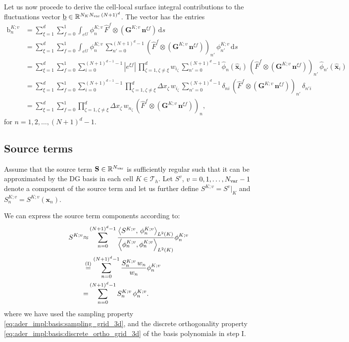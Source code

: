 \documentclass{scrreprt}
\theoremstyle{definition}
\theoremstyle{nonumberplain}
\renewcommand{\vec}[1]{{\textbf{#1}}}
\newcommand{\laVec}[1]{\underline{\mathrm{#1}}}
\newcommand{\laVecel}[1]{\mathrm{#1}}
\newcommand{\tria}{\mathcal{T}_h}
\newcommand{\cell}{K}
\newcommand{\face}{e}
\newcommand{\ds}{\text{d}s}
\newcommand{\refVec}[1]{\hat{\vec{#1}}}
\begin{document}
Let us now procede to derive the cell-local surface integral contributions to
the fluctuations vector $\laVec{b}\in \mathbb{R}^{N_\cell
N_\textup{var}\,(N+1)^d}$.
The vector has the entries
\begin{align*}
\laVecel{b}^{\cell;v}_n &=
\sum_{\xi=1}^{d}
\sum_{f=0}^{1}
\int_{\face^{\xi f}} {\phi}^{K;v}_{n}\,
\hat{F}^f\otimes(\vec{G}^{\cell;v}\,\vec{n}^{\xi
f})
\,\ds
\\
&=
\sum_{\xi=1}^{d}
\sum_{f=0}^{1}
\int_{\face^{\xi f}} {\phi}^{K;v}_{n}\,
\sum_{n'=0}^{(N+1)^{d}-1}
(\hat{F}^f\otimes(\vec{G}^{\cell;v}\,\vec{n}^{\xi
f}))_{n'}
\,
{\phi}^{K;v}_{n'}\,\ds
\\
&=
\sum_{\xi=1}^{d}
\sum_{f=0}^{1}
\sum_{i=0}^{(N+1)^{d-1}-1}
|e^{\xi f}|\,
\prod_{\zeta=1,\zeta\neq\xi}^d
w_{i_\zeta}\,
\sum_{n'=0}^{(N+1)^{d}-1}
\hat{\phi}_{n}(\refVec{x}_i)\,
(\hat{F}^f\otimes(\vec{G}^{\cell;v}\,\vec{n}^{\xi
f}))_{n'}
\,
\hat{\phi}_{n'}(\refVec{x}_i)
\\
&=
\sum_{\xi=1}^{d}
\sum_{f=0}^{1}
\sum_{i=0}^{(N+1)^{d-1}-1}
\prod_{\zeta=1,\zeta\neq\xi}^d
\Delta x_{\zeta}\,
w_{i_\zeta}\,
\sum_{n'=0}^{(N+1)^{d}-1}
\delta_{n i}\,
(\hat{F}^f\otimes(\vec{G}^{\cell;v}\,\vec{n}^{\xi
f}))_{n'}
\,
\delta_{n' i}
\\
&=
\sum_{\xi=1}^{d}
\sum_{f=0}^{1}
\prod_{\zeta=1,\zeta\neq\xi}^d
\Delta x_{\zeta}\,
w_{n_\zeta}\,
(\hat{F}^f\otimes(\vec{G}^{\cell;v}\,\vec{n}^{\xi
f}))_{n},
\end{align*}
for $n=1,2,\ldots,(N+1)^{d}-1$.
\subsection{Source terms}
Assume that the source term $\textbf{S}\in\mathbb{R}^{N_\textup{var}}$
is sufficiently regular such that it can be approximated by the DG basis in each
cell $\cell\in\tria$.
Let $S^v$, $v=0,1,\ldots,N_\textup{var}-1$ denote a component of the source term
and let us further define $S^{\cell;v} = S^v|_\cell$
and $S^{\cell;v}_n = S^{\cell;v}(\vec{x}_n)$.

We can express the source term components according to:
\begin{align*}
S^{\cell;v}
&{\approx}
\sum_{n=0}^{(N+1)^d-1}
\frac
{
\left\langle S^{\cell;v},\,{\phi}^{\cell;v}_{n}
\right\rangle_{L^2(\cell)}
}
{
\left\langle{\phi}^{\cell;v}_{n},{\phi}^{\cell;v}_{n}
\right\rangle_{L^2(\cell)}
}
{\phi}^{\cell;v}_{n}
\\
&\overset{\textup{(I)}}{=}
\sum_{n=0}^{(N+1)^d-1}
\frac
{
S^{\cell;v}_{n}\,w_{n}
}
{
w_{n}
}
{\phi}^{\cell;v}_{n}
\\
&{=}
\sum_{n=0}^{(N+1)^d-1}
S^{\cell;v}_{n}\,\phi^{\cell;v}_{n}.
\end{align*}
where we have used the sampling property
\eqref{eq:ader_impl:basis:sampling_grid_3d}, and
the discrete orthogonality property
\eqref{eq:ader_impl:basis:discrete_ortho_grid_3d}
of the basis polynomials in step I.
\end{document}
